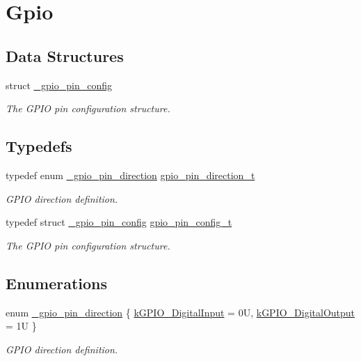 \hypertarget{group__gpio}{}\section{Gpio}
\label{group__gpio}
\subsection*{Data Structures}
\begin{DoxyCompactItemize}
\item 
struct \mbox{\hyperlink{struct__gpio__pin__config}{\+\_\+gpio\+\_\+pin\+\_\+config}}
\begin{DoxyCompactList}\small\item\em The G\+P\+IO pin configuration structure. \end{DoxyCompactList}\end{DoxyCompactItemize}
\subsection*{Typedefs}
\begin{DoxyCompactItemize}
\item 
\mbox{\label{group__gpio_gaf7d75755774a0f20385fbdda546f1f1d}} 
typedef enum \mbox{\hyperlink{group__gpio_ga0df4be96fa56f3bdd7bfa048fdaacd6b}{\+\_\+gpio\+\_\+pin\+\_\+direction}} \mbox{\hyperlink{group__gpio_gaf7d75755774a0f20385fbdda546f1f1d}{gpio\+\_\+pin\+\_\+direction\+\_\+t}}
\begin{DoxyCompactList}\small\item\em G\+P\+IO direction definition. \end{DoxyCompactList}\item 
typedef struct \mbox{\hyperlink{struct__gpio__pin__config}{\+\_\+gpio\+\_\+pin\+\_\+config}} \mbox{\hyperlink{group__gpio_ga9279df0a87f2432dc3c5d596028223b7}{gpio\+\_\+pin\+\_\+config\+\_\+t}}
\begin{DoxyCompactList}\small\item\em The G\+P\+IO pin configuration structure. \end{DoxyCompactList}\end{DoxyCompactItemize}
\subsection*{Enumerations}
\begin{DoxyCompactItemize}
\item 
enum \mbox{\hyperlink{group__gpio_ga0df4be96fa56f3bdd7bfa048fdaacd6b}{\+\_\+gpio\+\_\+pin\+\_\+direction}} \{ \mbox{\hyperlink{group__gpio_gga0df4be96fa56f3bdd7bfa048fdaacd6babacf19933be1940ab40c83535e6a46d4}{k\+G\+P\+I\+O\+\_\+\+Digital\+Input}} = 0U, 
\mbox{\hyperlink{group__gpio_gga0df4be96fa56f3bdd7bfa048fdaacd6ba509ebcd228fc813cf4afcacd258680f9}{k\+G\+P\+I\+O\+\_\+\+Digital\+Output}} = 1U
 \}
\begin{DoxyCompactList}\small\item\em G\+P\+IO direction definition. \end{DoxyCompactList}\end{DoxyCompactItemize}
